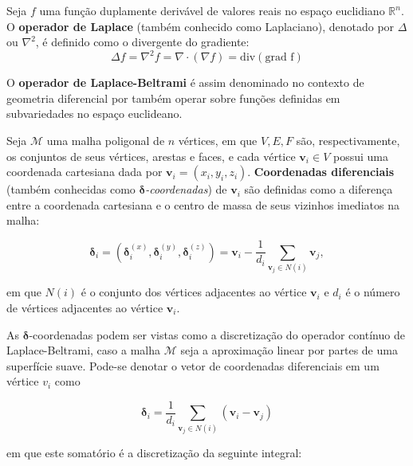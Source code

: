 \begin{defi}
Seja $f$ uma função duplamente derivável de valores reais no espaço euclidiano $\mathbb{R}^n$. O \textbf{operador de Laplace} (também conhecido como Laplaciano), denotado por $\Delta$ ou $\nabla^2$, é definido como o divergente do gradiente:
\begin{equation}
\Delta f = \nabla^2 f = \nabla \cdot (\nabla f) = \text{div} (\text{grad f})
\end{equation}
\end{defi}

O \textbf{operador de Laplace-Beltrami} é assim denominado no contexto de geometria diferencial por também operar sobre funções definidas em subvariedades no espaço euclideano.

\begin{defi}
	Seja $\mathcal{M}$ uma malha poligonal de $n$ vértices, em que $V, E, F$ são, respectivamente, os conjuntos de seus vértices, arestas e faces, e cada vértice $\mathbf{v}_i \in V$ possui uma coordenada cartesiana dada por $\mathbf{v}_i = (x_i,y_i,z_i)$. \textbf{Coordenadas diferenciais} (também conhecidas como $\mathbf{\delta}$\textit{-coordenadas}) de $\mathbf{v}_i$ são definidas como a diferença entre a coordenada cartesiana e o centro de massa de seus vizinhos imediatos na malha:
	
	\begin{equation}
	\mathbf{\delta}_i = (\mathbf{\delta}_i^{(x)}, \mathbf{\delta}_i^{(y)}, \mathbf{\delta}_i^{(z)}) = \mathbf{v}_i - \frac{1}{d_i} \sum_{\mathbf{v}_j \in N(i)} \mathbf{v}_j,
	\label{eq_delta}
	\end{equation}
	
	\noindent em que $N(i)$ é o conjunto dos vértices adjacentes ao vértice $\mathbf{v}_i$ e $d_i$ é o número de vértices adjacentes ao vértice $\mathbf{v}_i$.
\end{defi}

As $\mathbf{\delta}$-coordenadas podem ser vistas como a discretização do operador contínuo de Laplace-Beltrami, caso a malha $\mathcal{M}$ seja a aproximação linear por partes de uma superfície suave. Pode-se denotar o vetor de coordenadas diferenciais em um vértice $v_i$ como

\begin{equation}
\mathbf{\delta}_i = \frac{1}{d_i} \sum_{\mathbf{v}_j \in N(i)} (\mathbf{v}_i - \mathbf{v}_j)
\end{equation}

\noindent em que este somatório é a discretização da seguinte integral:


